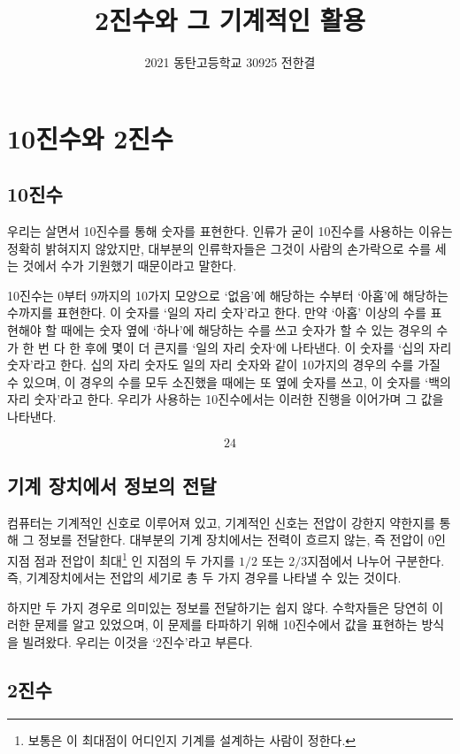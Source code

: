 \documentclass{article}
\title{2진수와 그 기계적인 활용}
\author{2021 동탄고등학교 30925 전한결}
\begin{document}
    
\maketitle
\tableofcontents
\pagebreak

\section{10진수와 2진수}

\subsection{10진수}

우리는 살면서 10진수를 통해 숫자를 표현한다.
인류가 굳이 10진수를 사용하는 이유는 정확히 밝혀지지 않았지만,
대부분의 인류학자들은 그것이 사람의 손가락으로 수를 세는 것에서
수가 기원했기 때문이라고 말한다.

10진수는 0부터 9까지의 10가지 모양으로 `없음'에 해당하는 수부터 `아홉'에 해당하는
수까지를 표현한다. 이 숫자를 `일의 자리 숫자'라고 한다.
만약 `아홉' 이상의 수를 표현해야 할 때에는 숫자 옆에 `하나'에
해당하는 수를 쓰고 숫자가 할 수 있는 경우의 수가 한 번 다 한 후에 몇이 더 큰지를
`일의 자리 숫자`에 나타낸다. 이 숫자를 `십의 자리 숫자'라고 한다.
십의 자리 숫자도 일의 자리 숫자와 같이 10가지의 경우의 수를 가질 수 있으며,
이 경우의 수를 모두 소진했을 때에는 또 옆에 숫자를 쓰고, 이 숫자를
`백의 자리 숫자'라고 한다.
우리가 사용하는 10진수에서는 이러한 진행을 이어가며 그 값을 나타낸다.

$$
24
$$

\subsection{기계 장치에서 정보의 전달}

컴퓨터는 기계적인 신호로 이루어져 있고, 기계적인 신호는 전압이 강한지 약한지를 통해
그 정보를 전달한다. 대부분의 기계 장치에서는 전력이 흐르지 않는, 즉 전압이 0인 지점
점과 전압이 최대\footnote{보통은 이 최대점이 어디인지 기계를 설계하는 사람이 정한다.}
인 지점의 두 가지를 $1/2$ 또는 $2/3$지점에서 나누어 구분한다.
즉, 기계장치에서는 전압의 세기로 총 두 가지 경우를 나타낼 수 있는 것이다.

하지만 두 가지 경우로 의미있는 정보를 전달하기는 쉽지 않다. 수학자들은 당연히 이러한
문제를 알고 있었으며, 이 문제를 타파하기 위해 10진수에서 값을 표현하는 방식을 빌려왔다.
우리는 이것을 `2진수'라고 부른다.

\subsection{2진수}
\end{document}
